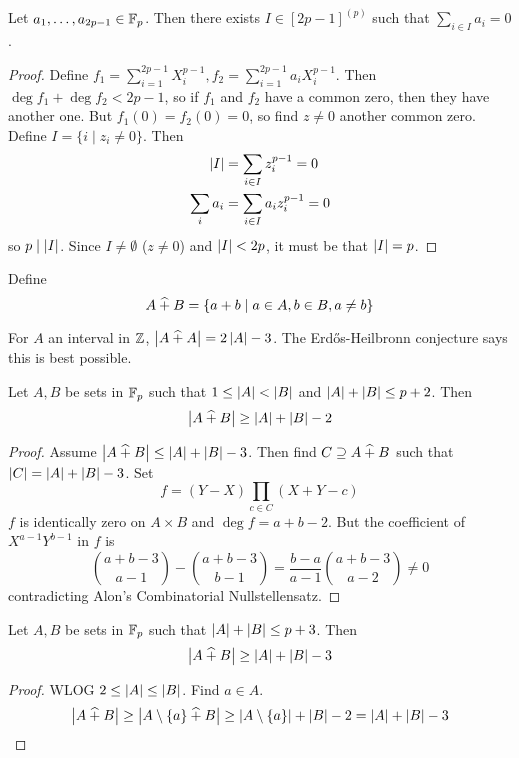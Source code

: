 \documentclass{article}
\begin{document}
\begin{nthm}
  Let $a_1, \dots, a_{2p - 1} \in \mathbb F_p$. Then there exists $I \in [2p - 1]^{(p)}$ such that $\sum_{i \in I} a_i = 0$.
\end{nthm}
\begin{proof}
  Define $f_1 = \sum_{i = 1}^{2p - 1} X_i^{p - 1}, f_2 = \sum_{i = 1}^{2p - 1} a_iX_i^{p - 1}$. Then $\deg f_1 + \deg f_2 < 2p - 1$, so if $f_1$ and $f_2$ have a common zero, then they have another one. But $f_1(0) = f_2(0) = 0$, so find $z \ne 0$ another common zero. Define $I = \{i \mid z_i \ne 0\}$. Then
  \begin{align*}
    \left\lvert I\right\rvert & = \sum_{i \in I} z_i^{p - 1} = 0 \\
    \sum_i a_i & = \sum_{i \in I} a_i z_i^{p - 1} = 0
  \end{align*}
  so $p \mid \left\lvert I\right\rvert$. Since $I \ne \emptyset$ ($z \ne 0$) and $\left\lvert I\right\rvert < 2p$, it must be that $\left\lvert I\right\rvert = p$.
\end{proof}

Define
$$A \mathbin{\widehat{+}} B = \{a + b \mid a \in A, b \in B, a \ne b\}$$

For $A$ an interval in $\mathbb Z$, $\left\lvert A \mathbin{\widehat{+}} A\right\rvert = 2\left\lvert A\right\rvert - 3$. The Erd\H os-Heilbronn conjecture says this is best possible.

\newlec

\begin{nthm}
  Let $A, B$ be sets in $\mathbb F_p$ such that $1 \le \left\lvert A\right\rvert < \left\lvert B\right\rvert$ and $\left\lvert A\right\rvert + \left\lvert B\right\rvert \le p + 2$. Then
  $$\left\lvert A \mathbin{\widehat{+}} B\right\rvert \ge \left\lvert A\right\rvert + \left\lvert B\right\rvert - 2$$
\end{nthm}
\begin{proof}
  Assume $\left\lvert A \mathbin{\widehat{+}} B\right\rvert \le \left\lvert A\right\rvert + \left\lvert B\right\rvert - 3$. Then find $C \supseteq A \mathbin{\widehat{+}} B$ such that $\left\lvert C\right\rvert = \left\lvert A\right\rvert + \left\lvert B\right\rvert - 3$. Set
  $$f = (Y - X)\prod_{c \in C} (X + Y - c)$$
  $f$ is identically zero on $A \times B$ and $\deg f = a + b - 2$. But the coefficient of $X^{a - 1}Y^{b - 1}$ in $f$ is
  $$\binom{a + b - 3}{a - 1} - \binom{a + b - 3}{b - 1} = \frac{b - a}{a - 1}\binom{a + b - 3}{a - 2} \ne 0$$
  contradicting Alon's Combinatorial Nullstellensatz.
\end{proof}

\begin{ncor}
  Let $A, B$ be sets in $\mathbb F_p$ such that $\left\lvert A\right\rvert + \left\lvert B\right\rvert \le p + 3$. Then
  $$\left\lvert A \mathbin{\widehat{+}} B\right\rvert \ge \left\lvert A\right\rvert + \left\lvert B\right\rvert - 3$$
\end{ncor}
\begin{proof}
  WLOG $2 \le \left\lvert A\right\rvert \le \left\lvert B\right\rvert$. Find $a \in A$.
  $$\left\lvert A \mathbin{\widehat{+}} B\right\rvert \ge \left\lvert A \setminus \{a\} \mathbin{\widehat{+}} B\right\rvert \ge \left\lvert A \setminus \{a\}\right\rvert + \left\lvert B\right\rvert - 2 = \left\lvert A\right\rvert + \left\lvert B\right\rvert - 3$$
\end{proof}
\end{document}

